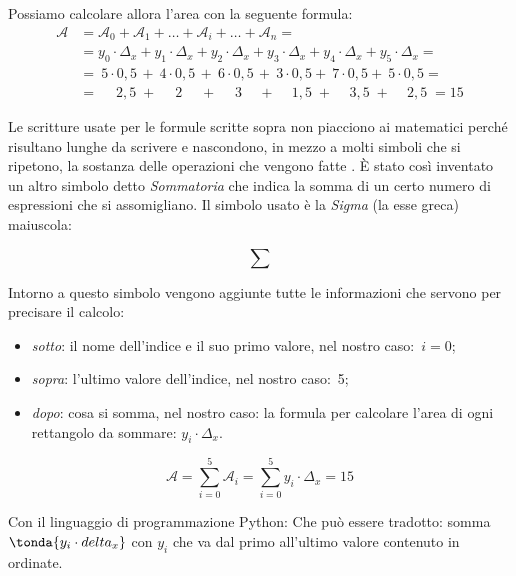 Possiamo calcolare allora l'area con la seguente formula:
\begin{align*}
  \mathcal{A} &= \mathcal{A}_0 + \mathcal{A}_1 + \dots + 
                 \mathcal{A}_i + \dots + \mathcal{A}_n = \\
              &= y_0 \cdot \Delta_x + y_1 \cdot \Delta_x + 
                 y_2 \cdot \Delta_x + y_3 \cdot \Delta_x + 
                 y_4 \cdot \Delta_x + y_5 \cdot \Delta_x = \\
              &= ~5 \cdot 0,5\, + ~4 \cdot 0,5\, + ~6 \cdot 0,5\, + 
                 ~3 \cdot 0,5 + ~7 \cdot 0,5 + ~5 \cdot 0,5 = \\
              &= \quad\; 2,5 \; + \quad\; 2 \quad\; + \quad\; 3 \quad\, + 
                 \quad\, 1,5 \; + \quad\, 3,5 \; + \quad\, 2,5 \; = 15
\end{align*}

Le scritture usate per le formule scritte sopra non piacciono ai matematici 
perché risultano lunghe da scrivere e nascondono, 
in mezzo a molti simboli che si ripetono, 
la sostanza delle operazioni che vengono fatte . 
È stato così inventato un altro simbolo detto 
\emph{Sommatoria} che indica la somma di un certo numero di espressioni che 
si assomigliano. Il simbolo usato è la \emph{Sigma} (la esse greca) maiuscola:

\[\sum\]

Intorno a questo simbolo vengono aggiunte tutte le informazioni che servono 
per precisare il calcolo:

\begin{itemize} [nosep]
 \item \emph{sotto}: il nome dell'indice e il suo primo valore, nel nostro 
caso:~\(i=0\);
 \item \emph{sopra}: l'ultimo valore dell'indice, nel nostro caso:~5;
 \item \emph{dopo}: cosa si somma, nel nostro caso: la formula per calcolare 
l'area di ogni rettangolo da sommare: \(y_i \cdot \Delta_x\).
\end{itemize}

\[\mathcal{A} = \sum_{i=0}^5 \mathcal{A}_i = 
                \sum_{i=0}^5 y_i \cdot \Delta_x = 15\]

\ifcoding
Con il linguaggio di programmazione Python:
Che può essere tradotto: somma 
\(\tonda{y_i \cdot delta_x}\) con \(y_i\) che va 
dal primo all'ultimo valore contenuto in ordinate.
\fi


